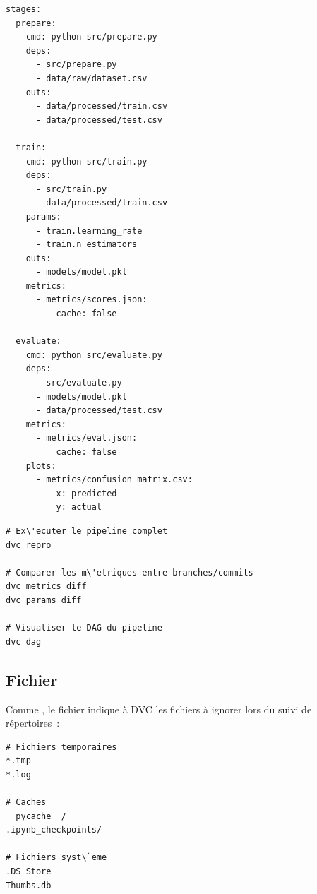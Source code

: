 \begin{codeblock}[title=\textbf{Exemple de \file{dvc.yaml}}]
\begin{verbatim}
stages:
  prepare:
    cmd: python src/prepare.py
    deps:
      - src/prepare.py
      - data/raw/dataset.csv
    outs:
      - data/processed/train.csv
      - data/processed/test.csv

  train:
    cmd: python src/train.py
    deps:
      - src/train.py
      - data/processed/train.csv
    params:
      - train.learning_rate
      - train.n_estimators
    outs:
      - models/model.pkl
    metrics:
      - metrics/scores.json:
          cache: false

  evaluate:
    cmd: python src/evaluate.py
    deps:
      - src/evaluate.py
      - models/model.pkl
      - data/processed/test.csv
    metrics:
      - metrics/eval.json:
          cache: false
    plots:
      - metrics/confusion_matrix.csv:
          x: predicted
          y: actual
\end{verbatim}
\end{codeblock}

\begin{codeblock}[title=\textbf{Ex\'ecution et comparaison de pipelines}]
\begin{verbatim}
# Ex\'ecuter le pipeline complet
dvc repro

# Comparer les m\'etriques entre branches/commits
dvc metrics diff
dvc params diff

# Visualiser le DAG du pipeline
dvc dag
\end{verbatim}
\end{codeblock}

\subsection{Fichier }

Comme , le fichier  indique \`a DVC les
fichiers \`a ignorer lors du suivi de r\'epertoires~:

\begin{codeblock}[title=\textbf{Exemple de \file{.dvcignore}}]
\begin{verbatim}
# Fichiers temporaires
*.tmp
*.log

# Caches
__pycache__/
.ipynb_checkpoints/

# Fichiers syst\`eme
.DS_Store
Thumbs.db
\end{verbatim}
\end{codeblock}

